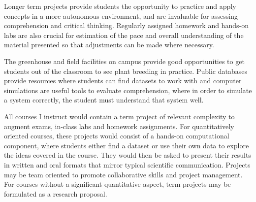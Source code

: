 \documentclass[11pt]{article}
\begin{document}
Longer term projects provide students the opportunity to practice and apply concepts in a more autonomous environment, and are invaluable for assessing comprehension and critical thinking. Regularly assigned homework and hands-on labs are also crucial for estimation of the pace and overall understanding of the material presented so that adjustments can be made where necessary. 

The greenhouse and field facilities on campus provide good opportunities to get students out of the classroom to see plant breeding in practice. Public databases provide resources where students can find datasets to work with and computer simulations are useful tools to evaluate comprehension, where in order to simulate a system correctly, the student must understand that system well.





All courses I instruct would contain a term project of relevant complexity to augment exams, in-class labs and homework assignments. For quantitatively oriented courses, these projects would consist of a hands-on computational component, where students either find a dataset or use their own data to explore the ideas covered in the course. They would then be asked to present their results in written and oral formats that mirror typical scientific communication. Projects may be team oriented to promote collaborative skills and project management. For courses without a significant quantitative aspect, term projects may be formulated as a research proposal.%
\end{document}
